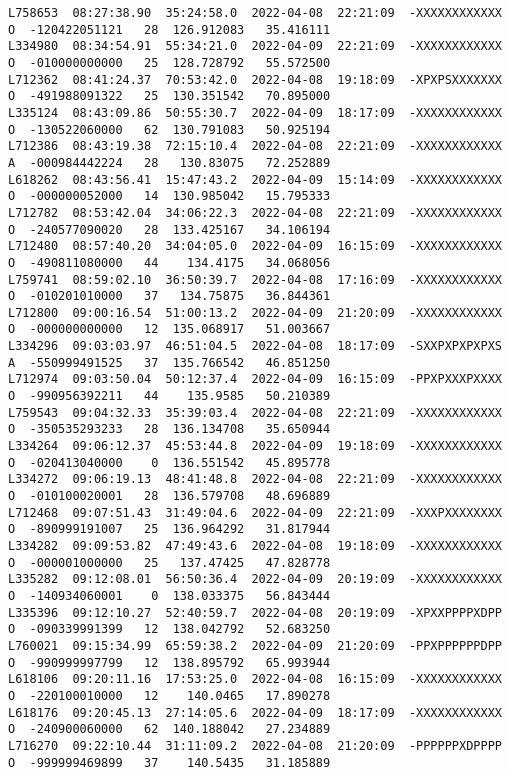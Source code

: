 \documentclass[12pt]{article}
\begin{document}
\begin{verbatim}
L758653  08:27:38.90  35:24:58.0  2022-04-08  22:21:09  -XXXXXXXXXXXX  O  -120422051121   28  126.912083   35.416111
L334980  08:34:54.91  55:34:21.0  2022-04-09  22:21:09  -XXXXXXXXXXXX  O  -010000000000   25  128.728792   55.572500
L712362  08:41:24.37  70:53:42.0  2022-04-08  19:18:09  -XPXPSXXXXXXX  O  -491988091322   25  130.351542   70.895000
L335124  08:43:09.86  50:55:30.7  2022-04-09  18:17:09  -XXXXXXXXXXXX  O  -130522060000   62  130.791083   50.925194
L712386  08:43:19.38  72:15:10.4  2022-04-08  22:21:09  -XXXXXXXXXXXX  A  -000984442224   28   130.83075   72.252889
L618262  08:43:56.41  15:47:43.2  2022-04-09  15:14:09  -XXXXXXXXXXXX  O  -000000052000   14  130.985042   15.795333
L712782  08:53:42.04  34:06:22.3  2022-04-08  22:21:09  -XXXXXXXXXXXX  O  -240577090020   28  133.425167   34.106194
L712480  08:57:40.20  34:04:05.0  2022-04-09  16:15:09  -XXXXXXXXXXXX  O  -490811080000   44    134.4175   34.068056
L759741  08:59:02.10  36:50:39.7  2022-04-08  17:16:09  -XXXXXXXXXXXX  O  -010201010000   37   134.75875   36.844361
L712800  09:00:16.54  51:00:13.2  2022-04-09  21:20:09  -XXXXXXXXXXXX  O  -000000000000   12  135.068917   51.003667
L334296  09:03:03.97  46:51:04.5  2022-04-08  18:17:09  -SXXPXPXPXPXS  A  -550999491525   37  135.766542   46.851250
L712974  09:03:50.04  50:12:37.4  2022-04-09  16:15:09  -PPXPXXXPXXXX  O  -990956392211   44    135.9585   50.210389
L759543  09:04:32.33  35:39:03.4  2022-04-08  22:21:09  -XXXXXXXXXXXX  O  -350535293233   28  136.134708   35.650944
L334264  09:06:12.37  45:53:44.8  2022-04-09  19:18:09  -XXXXXXXXXXXX  O  -020413040000    0  136.551542   45.895778
L334272  09:06:19.13  48:41:48.8  2022-04-08  22:21:09  -XXXXXXXXXXXX  O  -010100020001   28  136.579708   48.696889
L712468  09:07:51.43  31:49:04.6  2022-04-09  22:21:09  -XXXPXXXXXXXX  O  -890999191007   25  136.964292   31.817944
L334282  09:09:53.82  47:49:43.6  2022-04-08  19:18:09  -XXXXXXXXXXXX  O  -000001000000   25   137.47425   47.828778
L335282  09:12:08.01  56:50:36.4  2022-04-09  20:19:09  -XXXXXXXXXXXX  O  -140934060001    0  138.033375   56.843444
L335396  09:12:10.27  52:40:59.7  2022-04-08  20:19:09  -XPXXPPPPXDPP  O  -090339991399   12  138.042792   52.683250
L760021  09:15:34.99  65:59:38.2  2022-04-09  21:20:09  -PPXPPPPPPDPP  O  -990999997799   12  138.895792   65.993944
L618106  09:20:11.16  17:53:25.0  2022-04-08  16:15:09  -XXXXXXXXXXXX  O  -220100010000   12    140.0465   17.890278
L618176  09:20:45.13  27:14:05.6  2022-04-09  18:17:09  -XXXXXXXXXXXX  O  -240900060000   62  140.188042   27.234889
L716270  09:22:10.44  31:11:09.2  2022-04-08  21:20:09  -PPPPPPXDPPPP  O  -999999469899   37    140.5435   31.185889

\end{verbatim}
\end{document}
